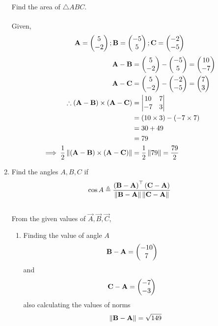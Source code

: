 \documentclass[10pt]{book}
\begin{document}
\begin{enumerate}[label=\thesection.\arabic*.,ref=\thesection.\theenumi]
Find the area of $\triangle ABC$.\\
\solution\\
Given,
\begin{align}
 \mathbf{A} = \begin{pmatrix}5\\-2\end{pmatrix};
 \mathbf{B} = \begin{pmatrix}-5\\5\end{pmatrix};
 \mathbf{C} = \begin{pmatrix}-2\\-5\end{pmatrix}
 \end{align}
 \begin{align}
 \mathbf{A}-\mathbf{B} &= \begin{pmatrix}5\\-2\end{pmatrix} - \begin{pmatrix}-5\\5\end{pmatrix} = \begin{pmatrix}10\\-7\end{pmatrix}\\
 \mathbf{A}-\mathbf{C} &= \begin{pmatrix}5\\-2\end{pmatrix} - \begin{pmatrix}-2\\-5\end{pmatrix} = \begin{pmatrix}7\\3\end{pmatrix}\\
\therefore(\mathbf{A}-\mathbf{B})\times(\mathbf{A}-\mathbf{C}) 
 &= \begin{vmatrix}10 & 7\\-7 & 3\end{vmatrix}\\
 &= \left(10 \times 3\right) - \left(-7 \times 7\right)\\ &= 30 + 49\\ &= 79\\
 \implies\frac{1}{2}\left\lVert(\mathbf{A}-\mathbf{B})\times(\mathbf{A}-\mathbf{C})\right\rVert &= \frac{1}{2}\left\lVert79\right\rVert= \frac{79}{2}
\end{align}
\item Find the angles $A, B, C$ if
    \label{prop:angle2d}
    \begin{align}
    \label{eq:angle2d}
    \cos A \triangleq
\frac{\brak{\vec{B}-\vec{A}}^{\top}\brak{{\vec{C}-\vec{A}}}}{\norm{\vec{B}-\vec{A}}\norm{\vec{C}-\vec{A}}}
\end{align}
\solution\\
From the given values of $\vec{A},\vec{B},\vec{C}$,\\
\begin{enumerate}
 \item Finding the value of angle $A$
\begin{align}
 \mathbf{B}-\mathbf{A} &=\begin{pmatrix}-10\\7\end{pmatrix}
\end{align}
and 
\begin{align}
 \mathbf{C}-\mathbf{A} &= \begin{pmatrix}-7\\-3\end{pmatrix}
\end{align}
also calculating the values of norms
\begin{align}
 \norm{\vec{B}-\vec{A}} &= \sqrt{149}\\

\end{align}
\end{enumerate}
\end{enumerate}
\end{document}
